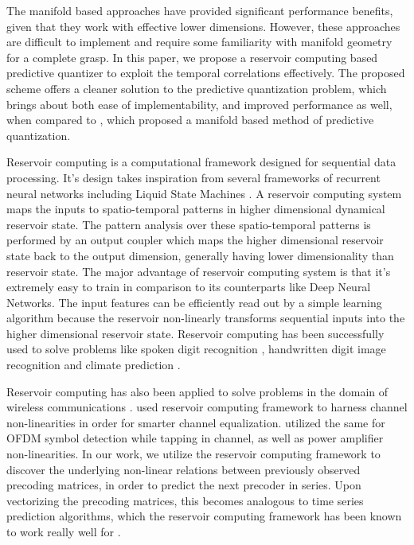 \documentclass[conference]{IEEEtran}
\begin{document}
The manifold based approaches have provided significant performance benefits, given that they work with effective lower dimensions.
However, these approaches are difficult to implement and require some familiarity with manifold geometry for a complete grasp.
In this paper, we propose a reservoir computing based predictive quantizer to exploit the temporal correlations effectively.
The proposed scheme offers a cleaner solution to the predictive quantization problem, which brings about both ease of implementability, and improved performance as well, when compared to \cite{6891198}, which proposed a manifold based method of predictive quantization.

Reservoir computing is a computational framework designed for sequential data processing. 
It's design takes inspiration from several frameworks of recurrent neural networks \cite{jaeger2004harnessing} including Liquid State Machines \cite{jalalvand2015real}. 
A reservoir computing system maps the inputs to spatio-temporal patterns in higher dimensional dynamical reservoir state. 
The pattern analysis over these spatio-temporal patterns is performed by an output coupler which maps the higher dimensional reservoir state back to the output dimension, generally having lower dimensionality than reservoir state. 
The major advantage of reservoir computing system is that it’s extremely easy to train in comparison to its counterparts like Deep Neural Networks. 
The input features can be efficiently read out by a simple learning algorithm because the reservoir non-linearly transforms sequential inputs into the higher dimensional reservoir state. 
Reservoir computing has been successfully used to solve problems like spoken digit recognition \cite{verstraeten2005isolated}, handwritten digit image recognition \cite{jalalvand2015real} and climate prediction \cite{pathak2017using}.  

Reservoir computing has also been applied to solve problems in the domain of wireless communications \cite{jaeger2004harnessing,mosleh2017brain,shafin2018realizing}. 
\cite{jaeger2004harnessing} used reservoir computing framework to harness channel non-linearities in order for smarter channel equalization.
\cite{mosleh2017brain,shafin2018realizing} utilized the same for OFDM symbol detection while tapping in channel, as well as power amplifier non-linearities.
In our work, we utilize the reservoir computing framework to discover the underlying non-linear relations between previously observed precoding matrices, in order to predict the next precoder in series. Upon vectorizing the precoding matrices, this becomes analogous to time series prediction algorithms, which the reservoir computing framework has been known to work really well for \cite{mosleh2017brain}.
\end{document}
